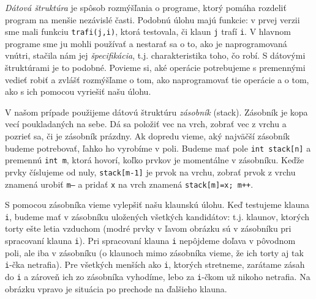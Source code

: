 \documentclass[10pt]{article}
\def\prg{\lstinline}
\def\ods{\vspace*{10pt}}
\begin{document}
\ods
{\em Dátová štruktúra} je spôsob rozmýšľania o programe, ktorý pomáha rozdeliť program
na menšie nezávislé časti. Podobnú úlohu majú funkcie: v prvej verzii sme mali
funkciu {\tt trafi(j,i)}, ktorá testovala, či klaun {\tt j} trafí {\tt i}. V hlavnom
programe sme ju mohli používať a nestarať sa o to, ako je naprogramovaná vnútri, stačila
nám jej {\em špecifikácia}, t.j. charakteristika toho, čo robí. S dátovými 
štruktúrami je to podobné.
Povieme si, aké operácie potrebujeme s premennými vedieť robiť a zvlášť rozmýšľame o tom,
ako naprogramovať tie operácie a o tom, ako s ich pomocou vyriešiť našu úlohu. 

\ods V našom prípade
použijeme dátovú štruktúru {\em zásobník} (stack). 
Zásobník je kopa vecí poukladaných na sebe. Dá
sa položiť vec na vrch, zobrať vec z vrchu a pozrieť sa, či je zásobník prázdny.
Ak dopredu vieme, aký najväčší zásobník budeme potrebovať, ľahko ho vyrobíme v poli.
Budeme mať pole \prg!int stack[n]! a premennú \prg!int m!, ktorá hovorí, koľko prvkov
je momentálne v zásobníku. Keďže prvky číslujeme od nuly, {\tt stack[m-1]} je 
prvok na vrchu, zobrať prvok z vrchu znamená urobiť {\tt m--} a pridať {\tt x} na vrch
znamená
{\tt stack[m]=x; m++}. 

\ods
S pomocou zásobníka vieme vylepšiť našu klaunskú úlohu. Keď testujeme klauna {\tt i},
budeme mať v zásobníku uložených všetkých kandidátov: t.j. klaunov, ktorých torty 
ešte letia vzduchom (modré prvky v ľavom obrázku sú v zásobníku pri spracovaní
klauna {\tt i}). Pri spracovaní klauna {\tt i} nepôjdeme doľava v pôvodnom poli,
ale iba v zásobníku (o klaunoch mimo zásobníka vieme, že ich torty aj tak
{\tt i}-čka netrafia). Pre všetkých menších ako {\tt i}, ktorých stretneme, 
zarátame zásah do {\tt i} a zároveň ich zo zásobníka vyhodíme, lebo za {\tt i}-čkom
už nikoho netrafia. Na obrázku vpravo je situácia po prechode na ďalšieho klauna.
\end{document}

